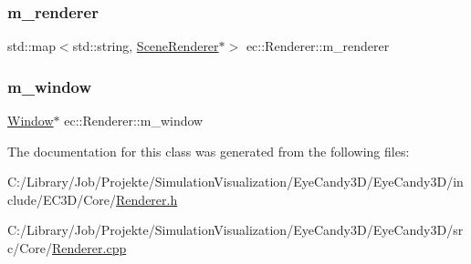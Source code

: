 \mbox{\label{classec_1_1_renderer_ac3f0c1c3253fbac0f734af313cc410a4}} 
\subsubsection{\texorpdfstring{m\+\_\+renderer}{m\_renderer}}
{\footnotesize\ttfamily std\+::map$<$std\+::string, \mbox{\hyperlink{classec_1_1_scene_renderer}{Scene\+Renderer}}$\ast$$>$ ec\+::\+Renderer\+::m\+\_\+renderer\hspace{0.3cm}{\ttfamily [protected]}}

\mbox{\label{classec_1_1_renderer_ac23d74f9d295bf833f095bdff8c8169b}} 
\subsubsection{\texorpdfstring{m\+\_\+window}{m\_window}}
{\footnotesize\ttfamily \mbox{\hyperlink{classec_1_1_window}{Window}}$\ast$ ec\+::\+Renderer\+::m\+\_\+window\hspace{0.3cm}{\ttfamily [protected]}}



The documentation for this class was generated from the following files\+:\begin{DoxyCompactItemize}
\item 
C\+:/\+Library/\+Job/\+Projekte/\+Simulation\+Visualization/\+Eye\+Candy3\+D/\+Eye\+Candy3\+D/include/\+E\+C3\+D/\+Core/\mbox{\hyperlink{_renderer_8h}{Renderer.\+h}}\item 
C\+:/\+Library/\+Job/\+Projekte/\+Simulation\+Visualization/\+Eye\+Candy3\+D/\+Eye\+Candy3\+D/src/\+Core/\mbox{\hyperlink{_renderer_8cpp}{Renderer.\+cpp}}\end{DoxyCompactItemize}
